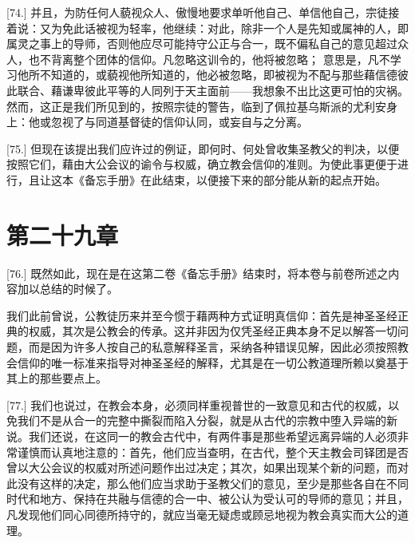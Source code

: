 [74.] 并且，为防任何人藐视众人、傲慢地要求单听他自己、单信他自己，宗徒接着说：又为免此话被视为轻率，他继续：对此，除非一个人是先知或属神的人，即属灵之事上的导师，否则他应尽可能持守公正与合一，既不偏私自己的意见超过众人，也不背离整个团体的信仰。凡忽略这训令的，他将被忽略； 意思是，凡不学习他所不知道的，或藐视他所知道的，他必被忽略，即被视为不配与那些藉信德彼此联合、藉谦卑彼此平等的人同列于天主面前——我想象不出比这更可怕的灾祸。然而，这正是我们所见到的，按照宗徒的警告，临到了佩拉基乌斯派的尤利安身上：他或忽视了与同道基督徒的信仰认同，或妄自与之分离。\par

[75.] 但现在该提出我们应许过的例证，即何时、何处曾收集圣教父的判决，以便按照它们，藉由大公会议的谕令与权威，确立教会信仰的准则。为使此事更便于进行，且让这本《备忘手册》在此结束，以便接下来的部分能从新的起点开始。\par

\par


\section{第二十九章}

\par

[76.] 既然如此，现在是在这第二卷《备忘手册》结束时，将本卷与前卷所述之内容加以总结的时候了。\par

我们此前曾说，公教徒历来并至今惯于藉两种方式证明真信仰：首先是神圣圣经正典的权威，其次是公教会的传承。这并非因为仅凭圣经正典本身不足以解答一切问题，而是因为许多人按自己的私意解释圣言，采纳各种错误见解，因此必须按照教会信仰的唯一标准来指导对神圣圣经的解释，尤其是在一切公教道理所赖以奠基于其上的那些要点上。\par

[77.] 我们也说过，在教会本身，必须同样重视普世的一致意见和古代的权威，以免我们不是从合一的完整中撕裂而陷入分裂，就是从古代的宗教中堕入异端的新说。我们还说，在这同一的教会古代中，有两件事是那些希望远离异端的人必须非常谨慎而认真地注意的：首先，他们应当查明，在古代，整个天主教会司铎团是否曾以大公会议的权威对所述问题作出过决定；其次，如果出现某个新的问题，而对此没有这样的决定，那么他们应当求助于圣教父们的意见，至少是那些各自在不同时代和地方、保持在共融与信德的合一中、被公认为受认可的导师的意见；并且，凡发现他们同心同德所持守的，就应当毫无疑虑或顾忌地视为教会真实而大公的道理。\par

